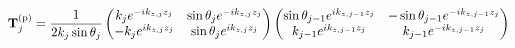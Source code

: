 \begin{align*}
	\vb{T}^{\text{(p)}}_j                               & = \frac{1}{2k_j\sin\theta_j}\pmqty{
	k_{j} e^{-ik_{z,j}z_j}                              &
	\sin\theta_{j} e^{-ik_{z,j}z_j}                                                               \\
	-k_{j} e^{ik_{z,j}z_j}                              &
	\sin\theta_{j} e^{ik_{z,j}z_j}
	}
	\pmqty{
	\sin\theta_{j-1} e^{ik_{z,j-1}z_j}                  &
	-\sin\theta_{j-1} e^{-ik_{z,j-1}z_j}                                                          \\
	k_{j-1} e^{ik_{z,j-1}z_j}                           &
	k_{j-1} e^{-ik_{z,j-1}z_j}
	}                                                                                             \\

\end{align*}
